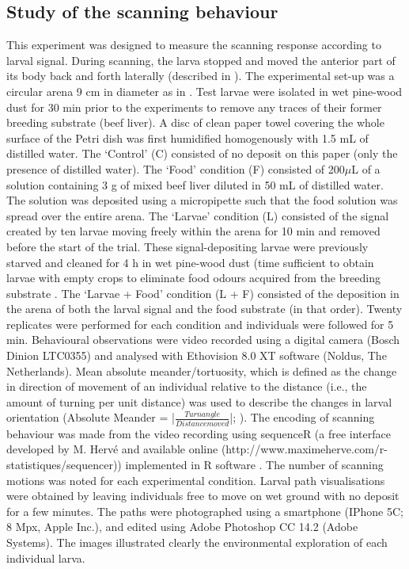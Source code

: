\clearpage
			\subsection{Study of the scanning behaviour}
This experiment was designed to measure the scanning response according to larval signal. During scanning, the larva stopped and moved the anterior part of its body back and forth laterally (described in \citet{green_organization_1983}). The experimental set-up was a circular arena 9 cm in diameter as in \citet{boulay_evidence_2013}. Test larvae were isolated in wet pine-wood dust for 30 min prior to the experiments to remove any traces of their former breeding substrate (beef liver). A disc of clean paper towel covering the whole surface of the Petri dish was first humidified homogenously with 1.5 mL of distilled water. The ‘Control’ (C) consisted of no deposit on this paper (only the presence of distilled water). The ‘Food’ condition (F) consisted of 200$\mu$L of a solution containing 3 g of mixed beef liver diluted in 50 mL of distilled water. The solution was deposited using a micropipette such that the food solution was spread over the entire arena. The ‘Larvae’ condition (L) consisted of the signal created by ten larvae moving freely within the arena for 10 min and removed before the start of the trial. These signal-depositing larvae were previously starved and cleaned for 4 h in wet pine-wood dust (time sufficient to obtain larvae with empty crops \cite{charabidze_discontinuous_2013} to eliminate food odours acquired from the breeding substrate \cite{boulay_evidence_2013}. The ‘Larvae + Food’ condition (L + F) consisted of the deposition in the arena of both the larval signal and the food substrate (in that order). Twenty replicates were performed for each condition and individuals were followed for 5 min. Behavioural observations were video recorded using a digital camera (Bosch Dinion LTC0355) and analysed with Ethovision 8.0 XT software (Noldus, The Netherlands). Mean absolute meander/tortuosity, which is defined as the change in direction of movement of an individual relative to the distance (i.e., the amount of turning per unit distance) was used to describe the changes in larval orientation \cite{granchietti_fruit_2012} (Absolute Meander = |$\frac{Turn angle}{Distance moved}$|; \cite{noldus_ethovision:_2001}). The encoding of scanning behaviour was made from the video recording using sequenceR (a free interface developed by M. Hervé and available online (http://www.maximeherve.com/r-statistiques/sequencer)) implemented in R software \cite{r_development_core_team_r:_2008}. The number of scanning motions was noted for each experimental condition. 
Larval path visualisations were obtained by leaving individuals free to move on wet ground with no deposit for a few minutes. The paths were photographed using a smartphone (IPhone 5C; 8 Mpx, Apple Inc.), and edited using Adobe Photoshop CC 14.2 (Adobe Systems). The images illustrated clearly the environmental exploration of each individual larva.

